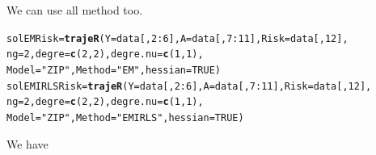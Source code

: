 \documentclass{article}\usepackage[]{graphicx}\usepackage[]{color}
\makeatletter
\newcommand{\hlnum}[1]{\textcolor[rgb]{0.686,0.059,0.569}{#1}}%
\newcommand{\hlstr}[1]{\textcolor[rgb]{0.192,0.494,0.8}{#1}}%
\newcommand{\hlopt}[1]{\textcolor[rgb]{0,0,0}{#1}}%
\newcommand{\hlstd}[1]{\textcolor[rgb]{0.345,0.345,0.345}{#1}}%
\newcommand{\hlkwb}[1]{\textcolor[rgb]{0.69,0.353,0.396}{#1}}%
\newcommand{\hlkwc}[1]{\textcolor[rgb]{0.333,0.667,0.333}{#1}}%
\newcommand{\hlkwd}[1]{\textcolor[rgb]{0.737,0.353,0.396}{\textbf{#1}}}%
\newenvironment{kframe}{%
 \def\at@end@of@kframe{}%
 \ifinner\ifhmode%
  \def\at@end@of@kframe{\end{minipage}}%
  \begin{minipage}{\columnwidth}%
 \fi\fi%
 \def\FrameCommand##1{\hskip\@totalleftmargin \hskip-\fboxsep
 \colorbox{shadecolor}{##1}\hskip-\fboxsep
     \hskip-\linewidth \hskip-\@totalleftmargin \hskip\columnwidth}%
 \MakeFramed {\advance\hsize-\width
   \@totalleftmargin\z@ \linewidth\hsize
   \@setminipage}}%
 {\par\unskip\endMakeFramed%
 \at@end@of@kframe}
\newenvironment{knitrout}{}{} %
\makeatother
\begin{document}
We can use all method too.
\begin{knitrout}
\color{fgcolor}\begin{kframe}
\begin{alltt}
\hlstd{solEMRisk} \hlkwb{=} \hlkwd{trajeR}\hlstd{(}\hlkwc{Y} \hlstd{= data[,}\hlnum{2}\hlopt{:}\hlnum{6}\hlstd{],} \hlkwc{A} \hlstd{= data[,}\hlnum{7}\hlopt{:}\hlnum{11}\hlstd{],} \hlkwc{Risk} \hlstd{= data[,}\hlnum{12}\hlstd{],}
                   \hlkwc{ng} \hlstd{=} \hlnum{2}\hlstd{,} \hlkwc{degre}\hlstd{=}\hlkwd{c}\hlstd{(}\hlnum{2}\hlstd{,}\hlnum{2}\hlstd{),} \hlkwc{degre.nu} \hlstd{=} \hlkwd{c}\hlstd{(}\hlnum{1}\hlstd{,}\hlnum{1}\hlstd{),}
                   \hlkwc{Model}\hlstd{=}\hlstr{"ZIP"}\hlstd{,} \hlkwc{Method} \hlstd{=} \hlstr{"EM"}\hlstd{,} \hlkwc{hessian} \hlstd{=} \hlnum{TRUE}\hlstd{)}
\hlstd{solEMIRLSRisk} \hlkwb{=} \hlkwd{trajeR}\hlstd{(}\hlkwc{Y} \hlstd{= data[,}\hlnum{2}\hlopt{:}\hlnum{6}\hlstd{],} \hlkwc{A} \hlstd{= data[,}\hlnum{7}\hlopt{:}\hlnum{11}\hlstd{],} \hlkwc{Risk} \hlstd{= data[,}\hlnum{12}\hlstd{],}
                       \hlkwc{ng} \hlstd{=} \hlnum{2}\hlstd{,} \hlkwc{degre}\hlstd{=}\hlkwd{c}\hlstd{(}\hlnum{2}\hlstd{,}\hlnum{2}\hlstd{),} \hlkwc{degre.nu} \hlstd{=} \hlkwd{c}\hlstd{(}\hlnum{1}\hlstd{,}\hlnum{1}\hlstd{),}
                       \hlkwc{Model}\hlstd{=}\hlstr{"ZIP"}\hlstd{,} \hlkwc{Method} \hlstd{=} \hlstr{"EMIRLS"}\hlstd{,} \hlkwc{hessian} \hlstd{=} \hlnum{TRUE}\hlstd{)}
\end{alltt}
\end{kframe}
\end{knitrout}
We have
\end{document}
